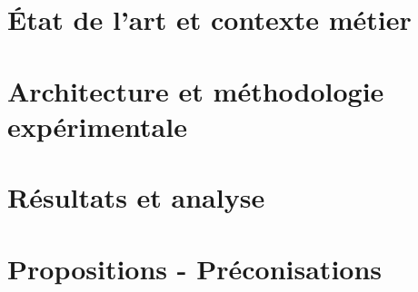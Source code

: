 \documentclass[12pt, a4paper]{report}
\begin{document}
\tableofcontents
\newpage

\listoffigures
\vspace{1cm} %
\listoftables
\newpage




\part{État de l'art et contexte métier}




\part{Architecture et méthodologie expérimentale}




\part{Résultats et analyse}



\part{Propositions - Préconisations}







% 
% 

\appendix

\end{document}
